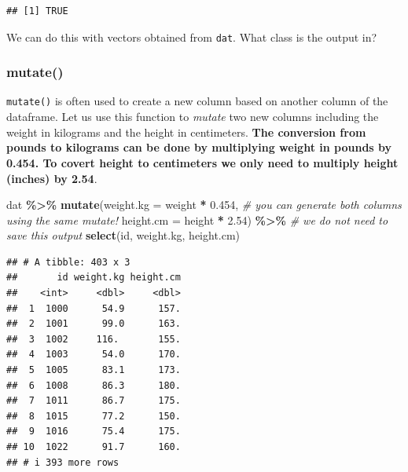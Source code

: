 \documentclass[
]{book}
\newenvironment{Shaded}{\begin{snugshade}}{\end{snugshade}}
\newcommand{\AttributeTok}[1]{\textcolor[rgb]{0.13,0.29,0.53}{#1}}
\newcommand{\CommentTok}[1]{\textcolor[rgb]{0.56,0.35,0.01}{\textit{#1}}}
\newcommand{\FloatTok}[1]{\textcolor[rgb]{0.00,0.00,0.81}{#1}}
\newcommand{\FunctionTok}[1]{\textcolor[rgb]{0.13,0.29,0.53}{\textbf{#1}}}
\newcommand{\NormalTok}[1]{#1}
\newcommand{\SpecialCharTok}[1]{\textcolor[rgb]{0.81,0.36,0.00}{\textbf{#1}}}
\begin{document}
\begin{verbatim}
## [1] TRUE
\end{verbatim}

We can do this with vectors obtained from \texttt{dat}. What class is the output in?

\begin{Shaded}
\end{Shaded}

\hypertarget{mutate}{%
\subsubsection{mutate()}\label{mutate}}

\texttt{mutate()} is often used to create a new column based on another column of the dataframe. Let us use this function to \emph{mutate} two new columns including the weight in kilograms and the height in centimeters. \textbf{The conversion from pounds to kilograms can be done by multiplying weight in pounds by 0.454. To covert height to centimeters we only need to multiply height (inches) by 2.54}.

\begin{Shaded}
\begin{Highlighting}[]
\NormalTok{dat }\SpecialCharTok{\%\textgreater{}\%}
  \FunctionTok{mutate}\NormalTok{(}\AttributeTok{weight.kg =}\NormalTok{ weight }\SpecialCharTok{*} \FloatTok{0.454}\NormalTok{,        }\CommentTok{\# you can generate both columns using the same mutate!}
         \AttributeTok{height.cm =}\NormalTok{ height }\SpecialCharTok{*} \FloatTok{2.54}\NormalTok{) }\SpecialCharTok{\%\textgreater{}\%}     \CommentTok{\# we do not need to save this output}
  \FunctionTok{select}\NormalTok{(id, weight.kg, height.cm)}
\end{Highlighting}
\end{Shaded}

\begin{verbatim}
## # A tibble: 403 x 3
##       id weight.kg height.cm
##    <int>     <dbl>     <dbl>
##  1  1000      54.9      157.
##  2  1001      99.0      163.
##  3  1002     116.       155.
##  4  1003      54.0      170.
##  5  1005      83.1      173.
##  6  1008      86.3      180.
##  7  1011      86.7      175.
##  8  1015      77.2      150.
##  9  1016      75.4      175.
## 10  1022      91.7      160.
## # i 393 more rows
\end{verbatim}
\end{document}
